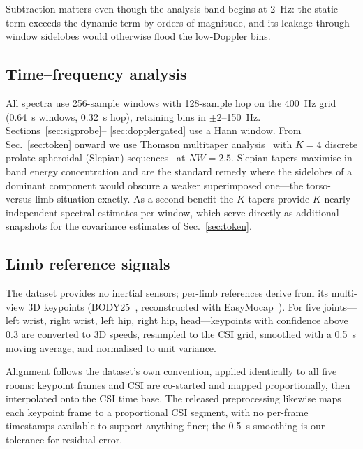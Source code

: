 \documentclass[conference]{IEEEtran}
\begin{document}
Subtraction matters even though the analysis band begins at \SI{2}{\hertz}: the
static term exceeds the dynamic term by orders of magnitude, and its leakage
through window sidelobes would otherwise flood the low-Doppler bins.

\subsection{Time--frequency analysis}
\label{sec:tf}

All spectra use \num{256}-sample windows with \num{128}-sample hop on the
\SI{400}{\hertz} grid (\SI{0.64}{\second} windows, \SI{0.32}{\second} hop),
retaining bins in $\pm 2$--\SI{150}{\hertz}. Sections~\ref{sec:sigprobe}--%
\ref{sec:dopplergated} use a Hann window. From Sec.~\ref{sec:token} onward we
use Thomson multitaper analysis~\cite{thomson1982multitaper} with $K = 4$
discrete prolate spheroidal (Slepian) sequences~\cite{slepian1978dpss} at
$NW = 2.5$. Slepian tapers maximise in-band energy concentration and are the
standard remedy where the sidelobes of a dominant component would obscure a
weaker superimposed one---the torso-versus-limb situation exactly. As a second
benefit the $K$ tapers provide $K$ nearly independent spectral estimates per
window, which serve directly as additional snapshots for the covariance
estimates of Sec.~\ref{sec:token}.

\subsection{Limb reference signals}
\label{sec:gt}

The dataset provides no inertial sensors; per-limb references derive from its
multi-view 3D keypoints (BODY25~\cite{cao2021openpose}, reconstructed with
EasyMocap~\cite{easymocap}). For five joints---left wrist, right wrist, left
hip, right hip, head---keypoints with confidence above \num{0.3} are converted
to 3D speeds, resampled to the CSI grid, smoothed with a \SI{0.5}{\second}
moving average, and normalised to unit variance.

Alignment follows the dataset's own convention, applied identically to all five
rooms: keypoint frames and CSI are co-started and mapped proportionally, then
interpolated onto the CSI time base. The released preprocessing likewise maps
each keypoint frame to a proportional CSI segment, with no per-frame timestamps
available to support anything finer; the \SI{0.5}{\second} smoothing is our
tolerance for residual error.
\end{document}
